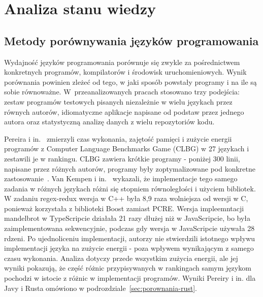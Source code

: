 \chapter{Analiza stanu wiedzy}
\label{chap:stan-wiedzy}

%

\section{Metody porównywania języków programowania}
\label{sec:metody-porownywania}

Wydajność języków programowania porównuje się zwykle za pośrednictwem konkretnych programów, kompilatorów i środowisk uruchomieniowych.
Wynik porównania powinien zleżeć od tego, w jaki sposób powstały programy i na ile są sobie równoważne.
W~przeanalizowanych pracach stosowano trzy podejścia: zestaw programów testowych pisanych niezależnie w wielu językach przez równych autorów, idiomatyczne aplikacje napisane od podstaw przez jednego autora oraz statystyczną analizę danych z wielu repozytoriów kodu.

Pereira i in.~\cite{pereira2021} zmierzyli czas wykonania, zajętość pamięci i zużycie energii programów z Computer Language Benchmarks Game (CLBG) w 27 językach i zestawili je w rankingu.
CLBG zawiera krótkie programy - poniżej 300 linii, napisane przez różnych autorów, programy były zoptymalizowane pod konkretne zastosowanie~\cite{vankempen2025}.
Van Kempen i in.~\cite{vankempen2025} wykazali, że implementacje tego samego zadania w różnych językach różni się stopniem równoległości i użyciem bibliotek.
W zadaniu regex-redux wersja w C++ była 8,9 raza wolniejsza od wersji w C, ponieważ korzystała z biblioteki Boost zamiast PCRE.
Wersja impleemntacji mandelbrot w TypeScripcie działała 21 razy dłużej niż w JavaScripcie, bo była zaimplementowana sekwencyjnie, podczas gdy wersja w JavaScripcie używała 28 rdzeni.
Po ujednoliceniu implementacji, autorzy nie stwierdzili istotnego wpływu implementacji języka na zużycie energii - poza wpływem wynikającym z samego czasu wykonania.
Analiza dotyczy przede wszystkim zużycia energii, ale jej wyniki pokazują, że część różnic przypisywanych w rankingach samym językom pochodzi w istocie z różnic w implementacji programów.
Wyniki Pereiry i in. dla Javy i Rusta omówiono w podrozdziale~\ref{sec:porownania-rust}.

